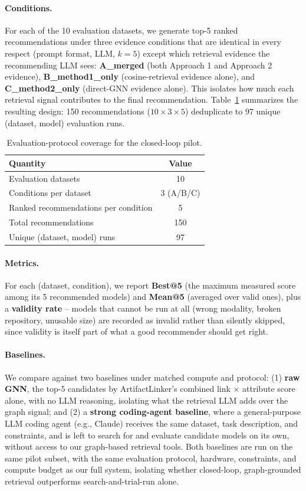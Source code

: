 \paragraph{Conditions.} For each of the 10 evaluation datasets, we generate top-5 ranked recommendations under three evidence conditions that are identical in every respect (prompt format, LLM, $k=5$) except which retrieval evidence the recommending LLM sees: \textbf{A\_merged} (both Approach 1 and Approach 2 evidence), \textbf{B\_method1\_only} (cosine-retrieval evidence alone), and \textbf{C\_method2\_only} (direct-GNN evidence alone). This isolates how much each retrieval signal contributes to the final recommendation. Table~\ref{tab:conditions} summarizes the resulting design: 150 recommendations ($10 \times 3 \times 5$) deduplicate to 97 unique (dataset, model) evaluation runs.

\begin{table}[t]
\centering
\small
\begin{tabular}{lc}
\toprule
\textbf{Quantity} & \textbf{Value} \\
\midrule
Evaluation datasets & 10 \\
Conditions per dataset & 3 (A/B/C) \\
Ranked recommendations per condition & 5 \\
Total recommendations & 150 \\
Unique (dataset, model) runs & 97 \\
\bottomrule
\end{tabular}
\caption{Evaluation-protocol coverage for the closed-loop pilot.}
\label{tab:conditions}
\end{table}

\paragraph{Metrics.} For each (dataset, condition), we report \textbf{Best@5} (the maximum measured score among its 5 recommended models) and \textbf{Mean@5} (averaged over valid ones), plus a \textbf{validity rate} -- models that cannot be run at all (wrong modality, broken repository, unusable size) are recorded as invalid rather than silently skipped, since validity is itself part of what a good recommender should get right.

\paragraph{Baselines.} We compare against two baselines under matched compute and protocol: (1) \textbf{raw GNN}, the top-5 candidates by ArtifactLinker's combined link $\times$ attribute score alone, with no LLM reasoning, isolating what the retrieval LLM adds over the graph signal; and (2) a \textbf{strong coding-agent baseline}, where a general-purpose LLM coding agent (e.g., Claude) receives the same dataset, task description, and constraints, and is left to search for and evaluate candidate models on its own, without access to our graph-based retrieval tools. Both baselines are run on the same pilot subset, with the same evaluation protocol, hardware, constraints, and compute budget as our full system, isolating whether closed-loop, graph-grounded retrieval outperforms search-and-trial-run alone.
